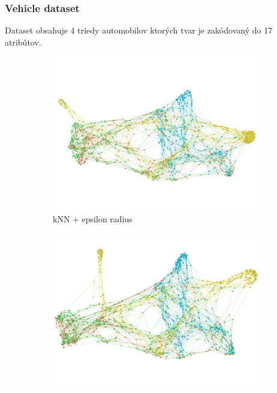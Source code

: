 \documentclass[slovak,master,dept460,male,cpp,cpdeclaration]{diploma}
\begin{document}
\subsubsection{Vehicle dataset}
Dataset obsahuje 4 triedy automobilov ktorých tvar je zakódovaný do 17 atribútov.\cite{vehicle}
\begin{figure}[H]
\centering
\begin{subfigure}{0.45\textwidth}
    \centering
    \includegraphics[width=\linewidth, frame]{Graphs/network_vehicle_knn_epsilon.jpg}
    \caption{kNN + epsilon radius}
    \label{fig:wine_knn_eps}
\end{subfigure}\hfil
\begin{subfigure}{0.45\textwidth}
    \centering
    \includegraphics[width=\linewidth, frame]{Graphs/network_vehicle_nnn.jpg}

\end{subfigure}
\end{figure}
\end{document}
